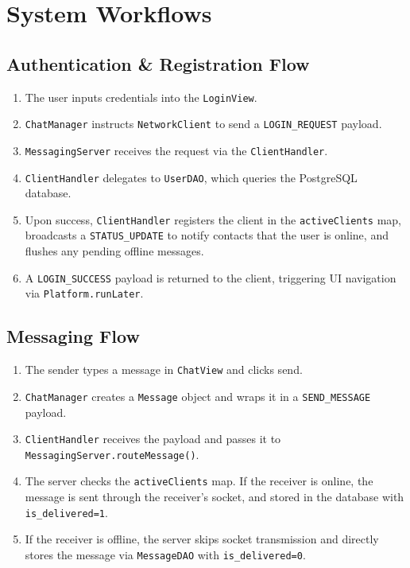 \documentclass[12pt,a4paper]{article}
\begin{document}
\section{System Workflows}

\subsection{Authentication \& Registration Flow}
\begin{enumerate}
    \item The user inputs credentials into the \texttt{LoginView}.
    \item \texttt{ChatManager} instructs \texttt{NetworkClient} to send a \texttt{LOGIN\_REQUEST} payload.
    \item \texttt{MessagingServer} receives the request via the \texttt{ClientHandler}.
    \item \texttt{ClientHandler} delegates to \texttt{UserDAO}, which queries the PostgreSQL database.
    \item Upon success, \texttt{ClientHandler} registers the client in the \texttt{activeClients} map, broadcasts a \texttt{STATUS\_UPDATE} to notify contacts that the user is online, and flushes any pending offline messages.
    \item A \texttt{LOGIN\_SUCCESS} payload is returned to the client, triggering UI navigation via \texttt{Platform.runLater}.
\end{enumerate}

\subsection{Messaging Flow}
\begin{enumerate}
    \item The sender types a message in \texttt{ChatView} and clicks send.
    \item \texttt{ChatManager} creates a \texttt{Message} object and wraps it in a \texttt{SEND\_MESSAGE} payload.
    \item \texttt{ClientHandler} receives the payload and passes it to \texttt{MessagingServer.routeMessage()}.
    \item The server checks the \texttt{activeClients} map. If the receiver is online, the message is sent through the receiver's socket, and stored in the database with \texttt{is\_delivered=1}.
    \item If the receiver is offline, the server skips socket transmission and directly stores the message via \texttt{MessageDAO} with \texttt{is\_delivered=0}.
\end{enumerate}
\end{document}
